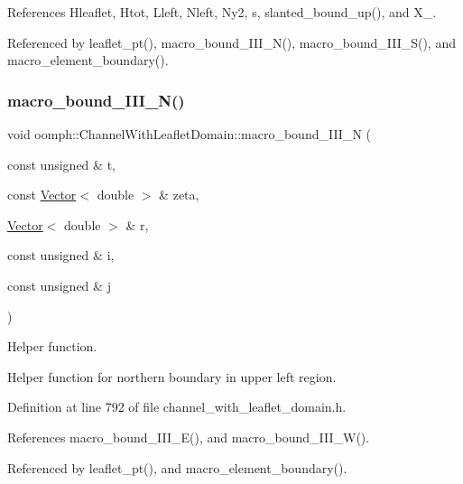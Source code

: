 References Hleaflet, Htot, Lleft, Nleft, Ny2, s, slanted\+\_\+bound\+\_\+up(), and X\+\_.



Referenced by leaflet\+\_\+pt(), macro\+\_\+bound\+\_\+\+I\+I\+I\+\_\+\+N(), macro\+\_\+bound\+\_\+\+I\+I\+I\+\_\+\+S(), and macro\+\_\+element\+\_\+boundary().

\mbox{\label{classoomph_1_1ChannelWithLeafletDomain_a8b7f88fb218ceb09f0fde09ba22cd5b9}} 
\subsubsection{\texorpdfstring{macro\+\_\+bound\+\_\+\+I\+I\+I\+\_\+\+N()}{macro\_bound\_III\_N()}}
{\footnotesize\ttfamily void oomph\+::\+Channel\+With\+Leaflet\+Domain\+::macro\+\_\+bound\+\_\+\+I\+I\+I\+\_\+N (\begin{DoxyParamCaption}\item[{const unsigned \&}]{t,  }\item[{const \hyperlink{classoomph_1_1Vector}{Vector}$<$ double $>$ \&}]{zeta,  }\item[{\hyperlink{classoomph_1_1Vector}{Vector}$<$ double $>$ \&}]{r,  }\item[{const unsigned \&}]{i,  }\item[{const unsigned \&}]{j }\end{DoxyParamCaption})\hspace{0.3cm}{\ttfamily [protected]}}



Helper function. 

Helper function for northern boundary in upper left region. 

Definition at line 792 of file channel\+\_\+with\+\_\+leaflet\+\_\+domain.\+h.



References macro\+\_\+bound\+\_\+\+I\+I\+I\+\_\+\+E(), and macro\+\_\+bound\+\_\+\+I\+I\+I\+\_\+\+W().



Referenced by leaflet\+\_\+pt(), and macro\+\_\+element\+\_\+boundary().

